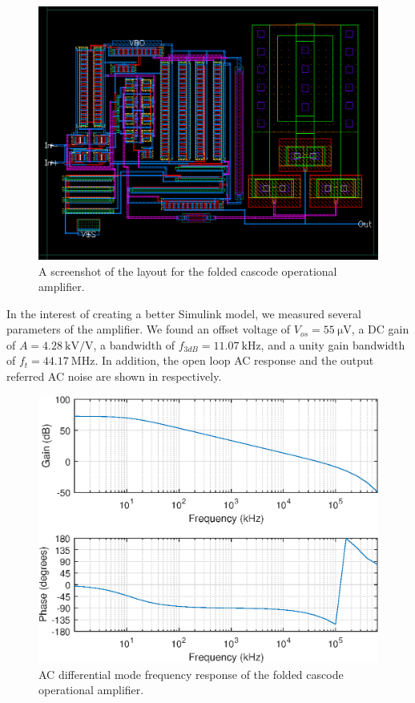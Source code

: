 \documentclass[journal,hidelinks]{IEEEtran}
\begin{document}
\begin{figure}[!htb]
  \centering
  \includegraphics[width=\columnwidth]{layout/folded_cascode.png}
  \caption{A screenshot of the layout for the folded cascode operational amplifier.}
  \label{fig:folded_cascode_layout}
\end{figure}

In the interest of creating a better Simulink model, we measured several parameters of the amplifier. We found an offset voltage of $V_{os} = \SI{55}{\micro\volt}$, a DC gain of $A = \SI{4.28}{\kilo\volt\per\volt}$, a bandwidth of $f_{3dB} = \SI{11.07}{\kilo\hertz}$, and a unity gain bandwidth of $f_t = \SI{44.17}{\mega\hertz}$. In addition, the open loop AC response and the output referred AC noise are shown in  respectively.

\begin{figure}[!htb]
  \centering
  \includegraphics[width=0.8\columnwidth]{circuit/folded_cascode/ac_dm.eps}
  \caption{AC differential mode frequency response of the folded cascode operational amplifier.}
  \label{fig:folded_cascode_ac_dm}
\end{figure}
\end{document}
